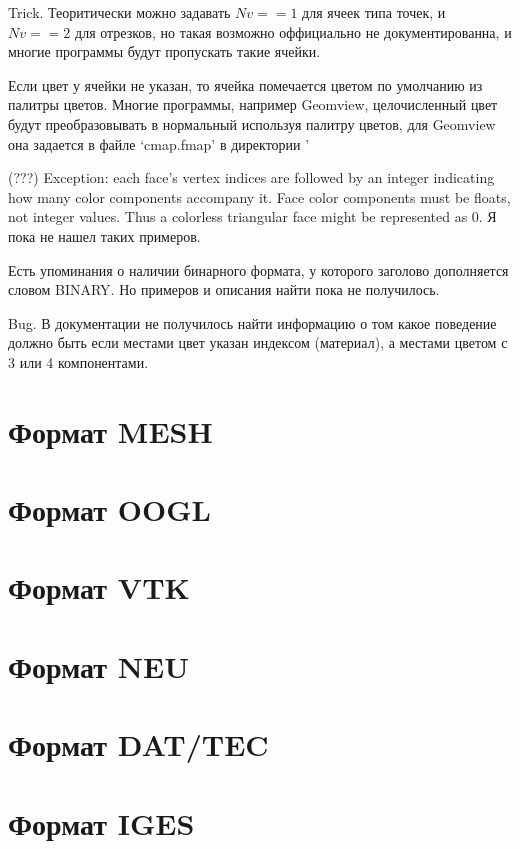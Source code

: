 \documentclass[a4paper,12pt]{article}
\begin{document}
Trick. Теоритически можно задавать $Nv==1$ для ячеек типа точек, и $Nv==2$ для отрезков, но такая возможно оффициально не документированна, и многие программы будут пропускать такие ячейки.

Если цвет у ячейки не указан, то ячейка помечается цветом по умолчанию из палитры цветов.
Многие программы, например Geomview, целочисленный цвет будут преобразовывать в нормальный используя палитру цветов, для Geomview она задается в файле `cmap.fmap' в директории '%

(???) Exception: each face's vertex indices are followed by an integer indicating how many color components accompany it. Face color components must be floats, not integer values. Thus a colorless triangular face might be represented as 0. Я пока не нашел таких примеров.

Есть упоминания о наличии бинарного формата, у которого заголово дополняется словом BINARY. Но примеров и описания найти пока не получилось.

Bug. В документации не получилось найти информацию о том какое поведение должно быть если местами цвет указан индексом (материал), а местами цветом с 3 или 4 компонентами.

\clearpage

\section{Формат MESH}
\section{Формат OOGL}
\section{Формат VTK}
\section{Формат NEU}
\section{Формат DAT/TEC}
\section{Формат IGES}
\end{document}
